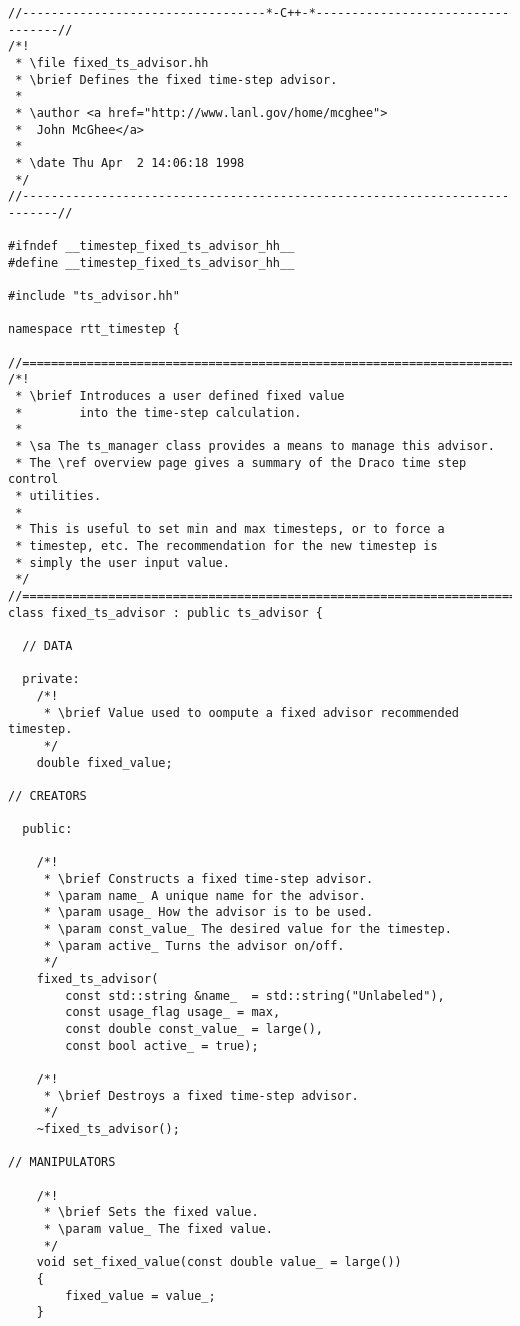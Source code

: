 \documentclass[11pt]{nmemo}
\begin{document}
\begin{verbatim}
//----------------------------------*-C++-*----------------------------------//
/*! 
 * \file fixed_ts_advisor.hh
 * \brief Defines the fixed time-step advisor.
 *
 * \author <a href="http://www.lanl.gov/home/mcghee">
 *  John McGhee</a>
 *
 * \date Thu Apr  2 14:06:18 1998
 */
//---------------------------------------------------------------------------//

#ifndef __timestep_fixed_ts_advisor_hh__
#define __timestep_fixed_ts_advisor_hh__

#include "ts_advisor.hh"

namespace rtt_timestep {

//===========================================================================//
/*!
 * \brief Introduces a user defined fixed value 
 *        into the time-step calculation.
 *
 * \sa The ts_manager class provides a means to manage this advisor.
 * The \ref overview page gives a summary of the Draco time step control
 * utilities. 
 *
 * This is useful to set min and max timesteps, or to force a
 * timestep, etc. The recommendation for the new timestep is
 * simply the user input value. 
 */ 
//===========================================================================//
class fixed_ts_advisor : public ts_advisor {

  // DATA

  private:
    /*!
     * \brief Value used to oompute a fixed advisor recommended timestep.
     */
    double fixed_value; 
   
// CREATORS

  public:

    /*!
     * \brief Constructs a fixed time-step advisor.
     * \param name_ A unique name for the advisor.
     * \param usage_ How the advisor is to be used.
     * \param const_value_ The desired value for the timestep.
     * \param active_ Turns the advisor on/off.
     */
    fixed_ts_advisor( 
        const std::string &name_  = std::string("Unlabeled"),
        const usage_flag usage_ = max, 
        const double const_value_ = large(),
        const bool active_ = true);

    /*!
     * \brief Destroys a fixed time-step advisor.
     */
    ~fixed_ts_advisor();

// MANIPULATORS
    
    /*!
     * \brief Sets the fixed value.
     * \param value_ The fixed value.
     */
    void set_fixed_value(const double value_ = large())
    { 
        fixed_value = value_;
    }


\end{verbatim}
\end{document}
